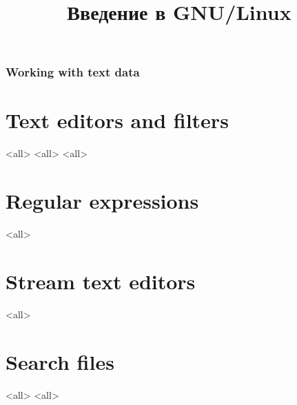 

\title{Введение в GNU/Linux}








\begin{frame}
	\frametitle{Working with text data}
	\titlepage
	\vspace{-0.5cm}
	\begin{center}
	\end{center}
\end{frame}




\section{Text editors and filters}
\mode<all>{}
\mode<all>{} 
\mode<all>{} 
\section{Regular expressions}
\mode<all>{} %
\section{Stream text editors}
\mode<all>{}
\section{Search files}
\mode<all>{}
\mode<all>{}




